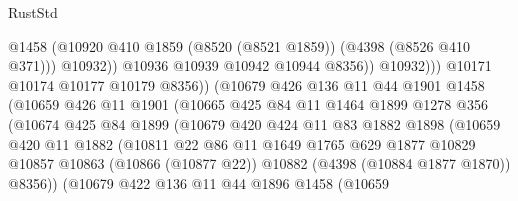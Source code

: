 \begin{lexlean}{RustStd}
\begin{coremodule}
                                    @1458
                                    (@10920
                                      @410
                                      @1859
                                      (@8520 (@8521 @1859))
                                      (@4398 (@8526 @410 @371)))
                                    @10932))
                                @10936
                                @10939
                                @10942
                                @10944
                                @8356))
                            @10932)))
                      @10171
                      @10174
                      @10177
                      @10179
                      @8356))
                  (@10679
                    @426
                    @136
                    @11
                    @44
                    @1901
                    @1458
                    (@10659
                      @426
                      @11
                      @1901
                      (@10665
                        @425
                        @84
                        @11
                        @1464
                        @1899
                        @1278
                        @356
                        (@10674
                          @425
                          @84
                          @1899
                          (@10679
                            @420
                            @424
                            @11
                            @83
                            @1882
                            @1898
                            (@10659
                              @420
                              @11
                              @1882
                              (@10811
                                @22
                                @86
                                @11
                                @1649
                                @1765
                                @629
                                @1877
                                @10829
                                @10857
                                @10863
                                (@10866 (@10877 @22))
                                @10882
                                (@4398 (@10884 @1877 @1870))
                                @8356))
                            (@10679
                              @422
                              @136
                              @11
                              @44
                              @1896
                              @1458
                              (@10659

\end{coremodule}
\end{lexlean}

